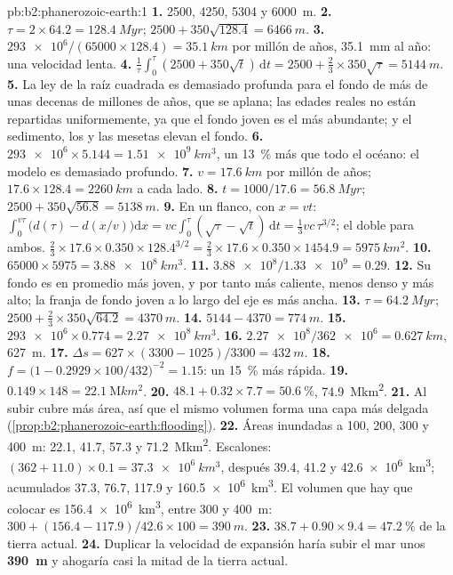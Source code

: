 \begin{solution}{pb:b2:phanerozoic-earth:1}
\textbf{1.} 2500, 4250, 5304 y \qty{6000}{m}.
\textbf{2.} $\tau = 2 \times 64.2 = \qty{128.4}{Myr}$; $2500 + 350\sqrt{128.4} = \qty{6466}{m}$.
\textbf{3.} $\num{293e6}/(65000 \times 128.4) = \qty{35.1}{km}$ por millón de años,
\qty{35.1}{mm} al año: una velocidad lenta.
\textbf{4.} $\frac1\tau\int_0^\tau(2500 + 350\sqrt t)\,\mathrm{d}t = 2500 + \frac23 \times
350\sqrt\tau = \qty{5144}{m}$.
\textbf{5.} La ley de la raíz cuadrada es demasiado profunda para el fondo de más de unas decenas de millones de años,
que se aplana; las edades reales no están repartidas uniformemente, ya que el fondo joven es el más abundante; y
el sedimento, los  y las mesetas elevan el fondo.
\textbf{6.} $\num{293e6} \times 5.144 = \qty{1.51e9}{km^3}$, un \qty{13}{\percent} más que
todo el océano: el modelo es demasiado profundo.
\textbf{7.} $v = \qty{17.6}{km}$ por millón de años; $17.6 \times 128.4 = \qty{2260}{km}$ a
cada lado.
\textbf{8.} $t = 1000/17.6 = \qty{56.8}{Myr}$; $2500 + 350\sqrt{56.8} = \qty{5138}{m}$.
\textbf{9.} En un flanco, con $x = vt$: $\int_0^{v\tau}\bigl(d(\tau) - d(x/v)\bigr)\mathrm{d}x
= vc\int_0^\tau(\sqrt\tau - \sqrt t)\,\mathrm{d}t = \frac13 vc\,\tau^{3/2}$; el doble para ambos.
$\frac23 \times 17.6 \times 0.350 \times 128.4^{3/2} = \frac23 \times 17.6 \times 0.350 \times
1454.9 = \qty{5975}{km^2}$.
\textbf{10.} $65000 \times 5975 = \qty{3.88e8}{km^3}$.
\textbf{11.} $\num{3.88e8}/\num{1.33e9} = 0.29$.
\textbf{12.} Su fondo es en promedio más joven, y por tanto más caliente, menos denso y más alto; la franja de fondo
joven a lo largo del eje es más ancha.
\textbf{13.} $\tau = \qty{64.2}{Myr}$; $2500 + \frac23 \times 350\sqrt{64.2} = \qty{4370}{m}$.
\textbf{14.} $5144 - 4370 = \qty{774}{m}$.
\textbf{15.} $\num{293e6} \times 0.774 = \qty{2.27e8}{km^3}$.
\textbf{16.} $\num{2.27e8}/\num{362e6} = \qty{0.627}{km}$, \qty{627}{m}.
\textbf{17.} $\Delta s = 627 \times (3300 - 1025)/3300 = \qty{432}{m}$.
\textbf{18.} $f = \bigl(1 - 0.2929 \times 100/432\bigr)^{-2} = 1.15$: un \qty{15}{\percent} más rápida.
\textbf{19.} $0.149 \times 148 = \qty{22.1}{\mega km^2}$.
\textbf{20.} $48.1 + 0.32 \times 7.7 = \qty{50.6}{\percent}$, \qty{74.9}{\mega km^2}.
\textbf{21.} Al subir cubre más área, así que el mismo volumen forma una capa más delgada
(\cref{prop:b2:phanerozoic-earth:flooding}).
\textbf{22.} Áreas inundadas a 100, 200, 300 y \qty{400}{m}: 22.1, 41.7, 57.3 y
\qty{71.2}{\mega km^2}. Escalones: $(362 + 11.0) \times 0.1 = \qty{37.3e6}{km^3}$, después 39.4, 41.2
y \qty{42.6e6}{km^3}; acumulados 37.3, 76.7, 117.9 y \qty{160.5e6}{km^3}. El volumen que hay que colocar
es \qty{156.4e6}{km^3}, entre 300 y \qty{400}{m}: $300 + (156.4 - 117.9)/42.6 \times 100
= \qty{390}{m}$.
\textbf{23.} $38.7 + 0.90 \times 9.4 = \qty{47.2}{\percent}$ de la tierra actual.
\textbf{24.} Duplicar la velocidad de expansión haría subir el mar unos \textbf{\qty{390}{m}} y
ahogaría casi la mitad de la tierra actual.
\end{solution}
